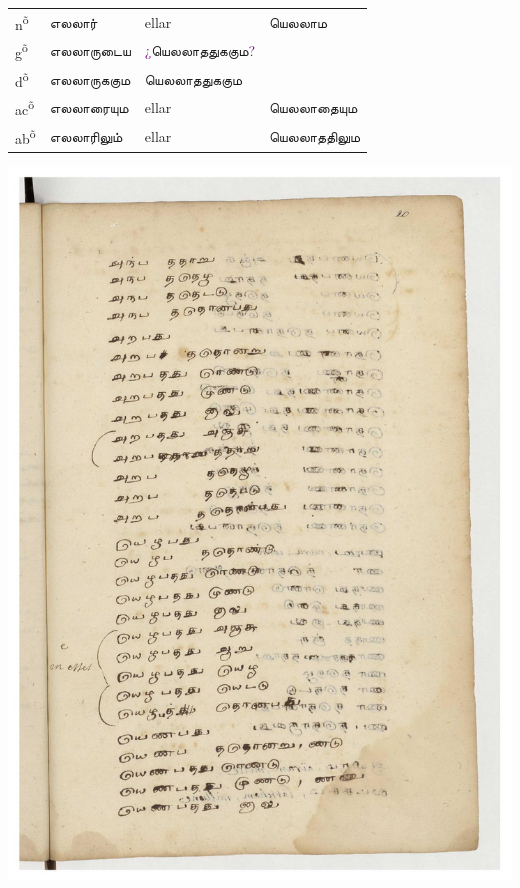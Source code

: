 \documentclass[12pt,a4paper]{scrbook}
\begin{document}
      
\begin{tabular}{llll}
    
        
          n\textsuperscript{õ} &
          எலலார் &
          ellar &
          யெலலாம \\
    
        
    
        
          g\textsuperscript{õ} &
          எலலாருடைய &
          
            \textcolor{purple}{¿}யெலலாததுககும\textcolor{purple}{?}
           \\
    
        
    
        
          d\textsuperscript{õ} &
          எலலாருககும &
          யெலலாததுககும \\
    
        
    
        
          ac\textsuperscript{õ} &
          எலலாரையும &
          ellar &
          யெலலாதையும \\
    
        
    
        
          ab\textsuperscript{õ} &
          எலலாரிலும் &
          ellar &
          யெலலாததிலும \\
    
        
    
      
\end{tabular}
    
      
\newpage
\hypertarget{img-49}{
    \includegraphics[width=\textwidth]{img-49}}
\newpage
\end{document}
